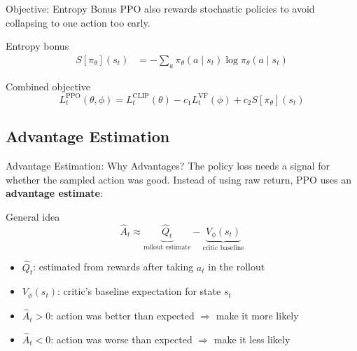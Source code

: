 \documentclass[aspectratio=169, 11pt]{beamer}
\begin{document}
\begin{frame}{Objective: Entropy Bonus}
  PPO also rewards stochastic policies to avoid collapsing to one action too
  early.

  \vspace{0.6em}
  \begin{block}{Entropy bonus}
    \begin{align*}
      S[\pi_\theta](s_t)
      &= -\sum_a \pi_\theta(a\mid s_t)\log \pi_\theta(a\mid s_t)
    \end{align*}
  \end{block}

  \vspace{0.4em}
  \begin{block}{Combined objective}
    \vspace{-0.4em}
    \[
      L_t^{\mathrm{PPO}}(\theta, \phi)
      = L_t^{\mathrm{CLIP}}(\theta)
        - c_1 L_t^{\mathrm{VF}}(\phi)
        + c_2 S[\pi_\theta](s_t)
    \]
    \vspace{-0.8em}
  \end{block}
\end{frame}


\subsection{Advantage Estimation}
\begin{frame}{Advantage Estimation: Why Advantages?}
  The policy loss needs a signal for whether the sampled action was good.
  Instead of using raw return, PPO uses an \textbf{advantage estimate}:

  \vspace{0.4em}
  \begin{block}{General idea}
    \[
      \hat{A}_t \approx
      \underbrace{\widehat{Q}_t}_{\text{rollout estimate}}
      -
      \underbrace{V_\phi(s_t)}_{\text{critic baseline}}
    \]
  \end{block}

  \begin{itemize}
    \item $\widehat{Q}_t$: estimated from rewards after taking $a_t$ in the rollout
    \item $V_\phi(s_t)$: critic's baseline expectation for state $s_t$
    \item $\hat{A}_t > 0$: action was better than expected $\Rightarrow$ make it more likely
    \item $\hat{A}_t < 0$: action was worse than expected $\Rightarrow$ make it less likely
  \end{itemize}
\end{frame}
\end{document}
